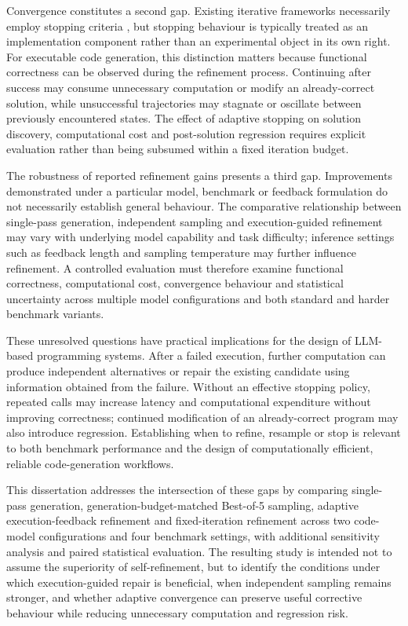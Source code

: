 Convergence constitutes a second gap. Existing iterative frameworks necessarily employ stopping criteria \citep{madaan2023selfrefine}, but stopping behaviour is typically treated as an implementation component rather than an experimental object in its own right. For executable code generation, this distinction matters because functional correctness can be observed during the refinement process. Continuing after success may consume unnecessary computation or modify an already-correct solution, while unsuccessful trajectories may stagnate or oscillate between previously encountered states. The effect of adaptive stopping on solution discovery, computational cost and post-solution regression requires explicit evaluation rather than being subsumed within a fixed iteration budget.

The robustness of reported refinement gains presents a third gap. Improvements demonstrated under a particular model, benchmark or feedback formulation do not necessarily establish general behaviour. The comparative relationship between single-pass generation, independent sampling and execution-guided refinement may vary with underlying model capability and task difficulty; inference settings such as feedback length and sampling temperature may further influence refinement. A controlled evaluation must therefore examine functional correctness, computational cost, convergence behaviour and statistical uncertainty across multiple model configurations and both standard and harder benchmark variants.

These unresolved questions have practical implications for the design of LLM-based programming systems. After a failed execution, further computation can produce independent alternatives or repair the existing candidate using information obtained from the failure. Without an effective stopping policy, repeated calls may increase latency and computational expenditure without improving correctness; continued modification of an already-correct program may also introduce regression. Establishing when to refine, resample or stop is relevant to both benchmark performance and the design of computationally efficient, reliable code-generation workflows.

This dissertation addresses the intersection of these gaps by comparing single-pass generation, generation-budget-matched Best-of-5 sampling, adaptive execution-feedback refinement and fixed-iteration refinement across two code-model configurations and four benchmark settings, with additional sensitivity analysis and paired statistical evaluation. The resulting study is intended not to assume the superiority of self-refinement, but to identify the conditions under which execution-guided repair is beneficial, when independent sampling remains stronger, and whether adaptive convergence can preserve useful corrective behaviour while reducing unnecessary computation and regression risk.

